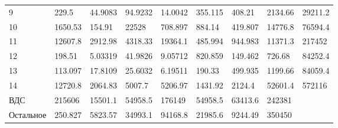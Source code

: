 \documentclass[12pt, a4paper]{article}
\begin{document}
\begin{tabular}{|l|llllllll|}
9 &                      229.5 &                                            44.9083 &                                   94.9232 &                                           14.0042 &      355.115 &                                             408.21 &                  2134.66 &       29211.2 \\
10 &                    1650.53 &                                             154.91 &                                     22528 &                                           708.897 &       884.14 &                                            419.807 &                  14776.8 &       76594.4 \\
11  &                    12607.8 &                                            2912.98 &                                   4318.33 &                                           19364.1 &      485.994 &                                            944.983 &                  11371.3 &        217452 \\
12   &                     198.51 &                                            5.03319 &                                   41.9826 &                                           9.05712 &      820.859 &                                            149.462 &                   726.68 &       84252.4 \\
13  &                    113.097 &                                            17.8109 &                                   25.6032 &                                           6.19511 &       190.33 &                                            499.935 &                  1199.66 &       84059.4 \\
14    &                    12720.8 &                                            2064.83 &                                    5007.7 &                                           5206.97 &      1431.92 &                                             2124.4 &                  52601.4 &        572116 \\
ВДС  &                     215606 &                                            15501.1 &                                   54958.5 &                                            176149 &      54958.5 &                                            63413.6 &                   242381 &              \\
Остальное   &                    250.827 &                                            5823.57 &                                   34993.1 &                                           94168.8 &      21985.6 &                                            9244.49 &                   350450 &              \\
\hline
\end{tabular}
\end{document}
